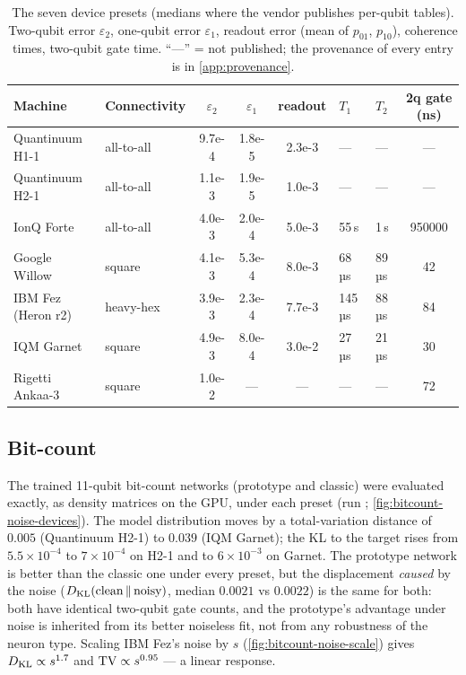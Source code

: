 \begin{table}[t]
\centering\small
\caption{The seven device presets (medians where the vendor publishes per-qubit tables).
Two-qubit error $\varepsilon_2$, one-qubit error $\varepsilon_1$, readout error (mean of
$p_{01}$, $p_{10}$), coherence times, two-qubit gate time.  ``—'' = not published; the
provenance of every entry is in \cref{app:provenance}.}
\label{tab:devices}
\begin{tabular}{@{}l l S[table-format=1.2e-1] S[table-format=1.1e-1] S[table-format=1.1e-1] l l S[table-format=5.0]@{}}
\toprule
Machine & Connectivity & {$\varepsilon_2$} & {$\varepsilon_1$} & {readout} & $T_1$ & $T_2$ & {2q gate (ns)} \\
\midrule
Quantinuum H1-1 & all-to-all & 9.7e-4 & 1.8e-5 & 2.3e-3 & — & — & {—} \\
Quantinuum H2-1 & all-to-all & 1.1e-3 & 1.9e-5 & 1.0e-3 & — & — & {—} \\
IonQ Forte & all-to-all & 4.0e-3 & 2.0e-4 & 5.0e-3 & 55\,s & 1\,s & 950000 \\
Google Willow & square & 4.1e-3 & 5.3e-4 & 8.0e-3 & 68\,µs & 89\,µs & 42 \\
IBM Fez (Heron r2) & heavy-hex & 3.9e-3 & 2.3e-4 & 7.7e-3 & 145\,µs & 88\,µs & 84 \\
IQM Garnet & square & 4.9e-3 & 8.0e-4 & 3.0e-2 & 27\,µs & 21\,µs & 30 \\
Rigetti Ankaa-3 & square & 1.0e-2 & {—} & {—} & — & — & 72 \\
\bottomrule
\end{tabular}
\end{table}

\subsection{Bit-count}
\label{sec:noise-bitcount}

The trained 11-qubit bit-count networks (prototype and classic) were evaluated exactly, as
density matrices on the GPU, under each preset
(run ; \cref{fig:bitcount-noise-devices}).  The model
distribution moves by a total-variation distance of $0.005$ (Quantinuum H2-1) to $0.039$ (IQM
Garnet); the KL to the target rises from $5.5\times10^{-4}$ to $7\times10^{-4}$ on H2-1 and to
$6\times10^{-3}$ on Garnet.  The prototype network is better than the classic one under every
preset, but the displacement \emph{caused} by the noise ($D_{\mathrm{KL}}(\text{clean}\,\|\,\text{noisy})$,
median $0.0021$ vs $0.0022$) is the same for both: both have identical two-qubit gate counts,
and the prototype's advantage under noise is inherited from its better noiseless fit, not from
any robustness of the neuron type.  Scaling IBM Fez's noise by $s$
(\cref{fig:bitcount-noise-scale}) gives $D_{\mathrm{KL}}\propto s^{1.7}$ and $\mathrm{TV}\propto s^{0.95}$ --- a
linear response.

